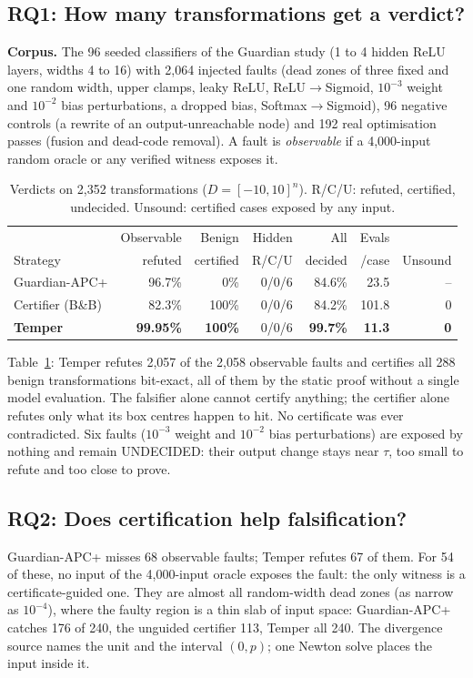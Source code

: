 \documentclass[conference]{IEEEtran}
\begin{document}
\subsection{RQ1: How many transformations get a verdict?}
\textbf{Corpus.} The 96 seeded classifiers of the Guardian study (1 to 4 hidden ReLU layers, widths 4 to 16) with 2{,}064 injected faults (dead zones of three fixed and one random width, upper clamps, leaky ReLU, ReLU$\to$Sigmoid, $10^{-3}$ weight and $10^{-2}$ bias perturbations, a dropped bias, Softmax$\to$Sigmoid), 96 negative controls (a rewrite of an output-unreachable node) and 192 real optimisation passes (fusion and dead-code removal). A fault is \emph{observable} if a 4{,}000-input random oracle or any verified witness exposes it.

\begin{table}[t]
\centering
\caption{Verdicts on 2{,}352 transformations ($D=[-10,10]^n$). R/C/U: refuted, certified, undecided. Unsound: certified cases exposed by any input.}
\label{tab:decide}
\setlength{\tabcolsep}{3pt}
\begin{tabular}{lrrrrrr}
\toprule
 & Observable & Benign & Hidden & All & Evals & \\
Strategy & refuted & certified & R/C/U & decided & /case & Unsound\\
\midrule
Guardian-APC+ & 96.7\% & 0\% & 0/0/6 & 84.6\% & 23.5 & --\\
Certifier (B\&B) & 82.3\% & 100\% & 0/0/6 & 84.2\% & 101.8 & 0\\
\textbf{Temper} & \textbf{99.95\%} & \textbf{100\%} & 0/0/6 & \textbf{99.7\%} & \textbf{11.3} & \textbf{0}\\
\bottomrule
\end{tabular}
\end{table}

Table~\ref{tab:decide}: Temper refutes 2{,}057 of the 2{,}058 observable faults and certifies all 288 benign transformations bit-exact, all of them by the static proof without a single model evaluation. The falsifier alone cannot certify anything; the certifier alone refutes only what its box centres happen to hit. No certificate was ever contradicted. Six faults ($10^{-3}$ weight and $10^{-2}$ bias perturbations) are exposed by nothing and remain UNDECIDED: their output change stays near $\tau$, too small to refute and too close to prove.

\subsection{RQ2: Does certification help falsification?}
Guardian-APC+ misses 68 observable faults; Temper refutes 67 of them. For 54 of these, no input of the 4{,}000-input oracle exposes the fault: the only witness is a certificate-guided one. They are almost all random-width dead zones (as narrow as $10^{-4}$), where the faulty region is a thin slab of input space: Guardian-APC+ catches 176 of 240, the unguided certifier 113, Temper all 240. The divergence source names the unit and the interval $(0,p)$; one Newton solve places the input inside it.
\end{document}
